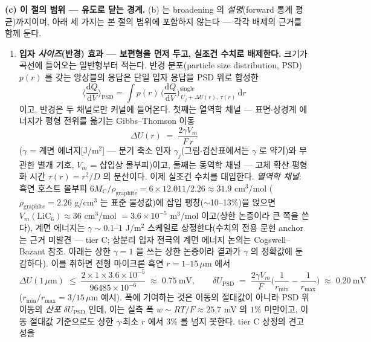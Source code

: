 \documentclass[11pt,a4paper]{article}
\newcommand{\dd}{\mathrm{d}}
\begin{document}
\textbf{(c) 이 절의 범위 — 유도로 닫는 경계.} (b) 는 broadening 의 \emph{설명}(forward 통계
평균)까지이며, 아래 세 가지는 본 절의 범위에 포함하지 않는다 — 각각 배제의 근거를 함께 둔다.
\begin{enumerate}[label=(\roman*),leftmargin=2.2em,itemsep=2.5pt]
\item \textbf{입자 \emph{사이즈}(반경) 효과 — 보편형을 먼저 두고, 실조건 수치로 배제한다.} 크기가 곡선에
들어오는 일반형부터 적는다. 반경 분포(particle size distribution, PSD) $p(r)$ 를 갖는 앙상블의 응답은
단일 입자 응답을 PSD 위로 합성한
\begin{equation}
\Big\langle\frac{\dd Q}{\dd V}\Big\rangle_\mathrm{PSD}
=\int p(r)\,\Big(\frac{\dd Q}{\dd V}\Big)^{\mathrm{single}}_{\,U_j+\Delta U(r),\ \tau(r)}\,\dd r
\label{eq:psdconv}
\end{equation}
이고, 반경은 두 채널로만 커널에 들어온다. 첫째는 열역학 채널 — 표면$\cdot$상경계 에너지가 평형 전위를
옮기는 Gibbs--Thomson 이동
\begin{equation}
\Delta U(r)\;=\;\frac{2\gamma V_m}{F\,r}
\label{eq:gibbsthomson}
\end{equation}
($\gamma$ = 계면 에너지[J/m$^2$] — 분기 축소 인자 $\gamma_j$(그림$\cdot$검산표에서는 $\gamma$ 로
약기)와 무관한 별개 기호, $V_m$ = 삽입상
몰부피)이고, 둘째는 동역학 채널 — 고체 확산 평형화 시간
$\tau(r)=r^2/D$ 의 분산이다. 이제 실조건 수치를 대입한다. \emph{열역학 채널}: 흑연 호스트 몰부피
$6M_\mathrm{C}/\rho_\mathrm{graphite}=6\times12.011/2.26\approx31.9$ cm$^3$/mol
($\rho_\mathrm{graphite}=2.26$ g/cm$^3$ 는 표준 물성값)에 삽입 팽창($\sim$10--13\%)을 얹으면
$V_m(\mathrm{LiC_6})\approx36$ cm$^3$/mol $=3.6\times10^{-5}$ m$^3$/mol 이고(상한 논증이라 큰 쪽을 쓴다),
계면 에너지는 $\gamma\sim0.1$--$1$ J/m$^2$ 스케일로 상정한다(수치의 전용 문헌 anchor 는 근거 미발견 —
tier C; 상분리 입자 전극의 계면 에너지 논의는 Cogswell--Bazant\cite{cogswell2012} 참조. 아래는 상한
$\gamma=1$ 을 쓰는 상한 논증이라 결과가 $\gamma$ 의 정확값에 둔감하다). 이를 취하면
전형 마이크론 흑연 $r=1$--$15\,\mu$m 에서
\[
\Delta U(1\,\mu\mathrm m)\;\le\;\frac{2\times1\times3.6\times10^{-5}}{96485\times10^{-6}}
\;\approx\;0.75\ \mathrm{mV},
\qquad
\delta U_\mathrm{PSD}\;=\;\frac{2\gamma V_m}{F}\Big(\frac{1}{r_{\min}}-\frac{1}{r_{\max}}\Big)
\;\approx\;0.20\ \mathrm{mV}
\]
($r_{\min}/r_{\max}=3/15\,\mu$m 예시). 폭에 기여하는 것은 이동의 절대값이 아니라 PSD 위 이동의
\emph{산포} $\delta U_\mathrm{PSD}$ 인데, 이는 실측 폭 $w\sim RT/F\approx25.7$ mV 의 $1\%$ 미만이고,
이동 절대값 기준으로도 상한 $\gamma$$\cdot$최소 $r$ 에서 $3\%$ 를 넘지 못한다. tier C 상정의 견고성을
$$
\end{enumerate}
\end{document}
